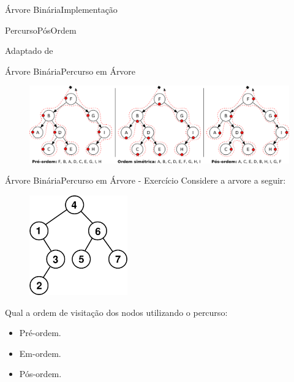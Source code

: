 \documentclass[aspectratio=169]{beamer}
\begin{document}

\begin{frame}{Árvore Binária}{Implementação}
\begin{algorithm}[H]
\caption{PercursoPósOrdem} 
\label{PercursoPosOrdem}
\end{algorithm}
\tiny{Adaptado de \cite{Backes2016}}
\end{frame}


\begin{frame}{Árvore Binária}{Percurso em Árvore}

\begin{figure}[!h]
  \centering
  \includegraphics[width=350pt]{imagens/percurso.png}
  \label{fig_percurso}
\end{figure}
\end{frame}

\begin{frame}{Árvore Binária}{Percurso em Árvore - Exercício}
Considere a arvore a seguir:
\begin{figure}[!h]
  \centering
  \includegraphics[width=120pt]{imagens/exercicio1.png}
  \label{fig_exercicio1}
\end{figure}
Qual a ordem de visitação dos nodos utilizando o percurso:
\begin{itemize}
 \item Pré-ordem.
 \item Em-ordem.
 \item Pós-ordem.
\end{itemize}
\end{frame}
\end{document}
